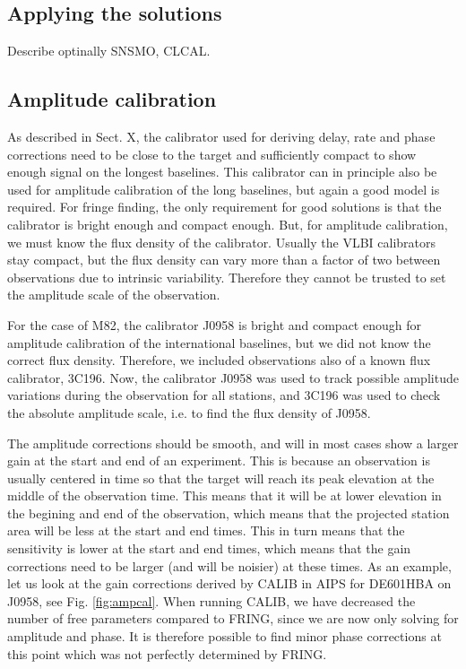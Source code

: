 \subsection{Applying the solutions}
Describe optinally SNSMO, CLCAL.

\subsection{Amplitude calibration}
As described in Sect. X, the calibrator used for deriving delay, rate and phase
corrections need to be close to the target and sufficiently compact to show
enough signal on the longest baselines. This calibrator can in principle also
be used for amplitude calibration of the long baselines, but again a good model
is required. For fringe finding, the only requirement for good solutions is
that the calibrator is bright enough and compact enough.  But, for amplitude
calibration, we must know the flux density of the calibrator.  Usually the VLBI
calibrators stay compact, but the flux density can vary more than a factor of
two between observations due to intrinsic variability. Therefore they cannot be
trusted to set the amplitude scale of the observation. 

For the case of M82, the calibrator J0958 is bright and compact enough for amplitude
calibration of the international baselines, but we did not know the correct flux density. 
Therefore, we included observations also of a known flux calibrator, 3C196. Now, the calibrator J0958
was used to track possible amplitude variations during the observation for all stations, and
3C196 was used to check the absolute amplitude scale, i.e. to find the flux density of J0958. 

The amplitude corrections should be smooth, and will in most cases show a larger gain at the start and end of an experiment.
This is because an observation is usually centered in time so that the target will reach its peak elevation at the middle of the
observation time. This means that it will be at lower elevation in the begining and end of the observation, which means that
the projected station area will be less at the start and end times. This in turn means that the sensitivity is lower at the start
and end times, which means that the gain corrections need to be larger (and will be noisier) at these times. As an example,
let us look at the gain corrections derived by CALIB in AIPS for DE601HBA on J0958, see Fig. \ref{fig:ampcal}.
When running CALIB, we have decreased the number of free parameters compared to FRING, since we are now only solving for amplitude and phase. 
It is therefore possible to find minor phase corrections at this point which was not perfectly determined by FRING.

